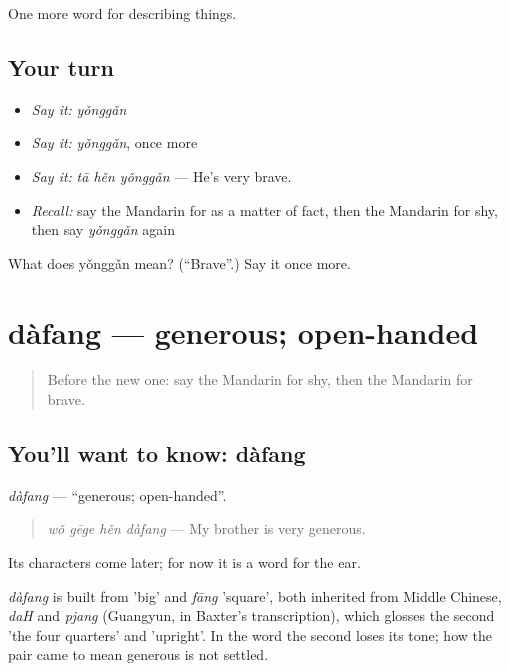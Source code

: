 \begin{grammarlens}[title={What you've built}]
One more word for describing things.
\end{grammarlens}

\subsection*{Your turn}
\begin{itemize}
\raggedright
  \item \emph{Say it:} \emph{yǒnggǎn}
  \item \emph{Say it:} \emph{yǒnggǎn}, once more
  \item \emph{Say it:} \emph{tā hěn yǒnggǎn} — He's very brave.
  \item \emph{Recall:} say the Mandarin for as a matter of fact, then the Mandarin for shy, then say \emph{yǒnggǎn} again
\end{itemize}

\begin{tcolorbox}[breakable,colback=teal!4,colframe=teal!35!black,title={Before you move on}]
What does yǒnggǎn mean? (\textquotedblleft{}Brave\textquotedblright{}.) Say it once more.
\end{tcolorbox}
\section[dàfang]{dàfang — generous; open-handed}

\label{lesson:ZH-C265-dafang}



\begin{quote}
Before the new one: say the Mandarin for shy, then the Mandarin for brave.
\end{quote}

\subsection*{You'll want to know: dàfang}
\emph{dàfang} — \textquotedblleft{}generous; open-handed\textquotedblright{}.

\begin{quote}
\emph{wǒ gēge hěn dàfang} — My brother is very generous.
\end{quote}

Its characters come later; for now it is a word for the ear.

\begin{cousinweb}
\emph{dàfang} is built from  'big' and \emph{fāng} 'square', both inherited from Middle Chinese, \emph{daH} and \emph{pjang} (Guangyun, in Baxter's transcription), which glosses the second 'the four quarters' and 'upright'. In the word the second loses its tone; how the pair came to mean generous is not settled.
\end{cousinweb}

